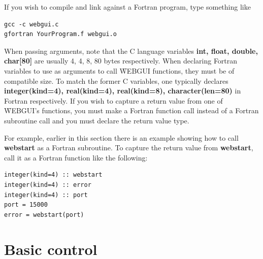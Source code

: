 If you wish to compile and link against a Fortran program, type something like
\begin{verbatim}
gcc -c webgui.c
gfortran YourProgram.f webgui.o 
\end{verbatim}

When passing arguments, note that the C language variables \textbf{int, float, double, char[80]} are usually 4, 4, 8, 80 bytes 
respectively. When declaring Fortran variables to use as arguments to call \f{WEBGUI} functions, they must be of compatible size. 
To match the former C variables, one typically declares
 \textbf{integer(kind=4), real(kind=4), real(kind=8), character(len=80)} in Fortran respectively. If you wish to capture a return value
 from one of \f{WEBGUI}'s functions, you must make a Fortran function call instead of a Fortran subroutine call and you must declare
 the return value type.
 
 For example, earlier in this section there is an example showing how to call \textbf{webstart} as a Fortran subroutine. To capture
 the return value from \textbf{webstart}, call it as a Fortran function like the following:
 \begin{verbatim}
integer(kind=4) :: webstart
integer(kind=4) :: error 
integer(kind=4) :: port
port = 15000
error = webstart(port)
\end{verbatim}

\newpage
\section{Basic control}
